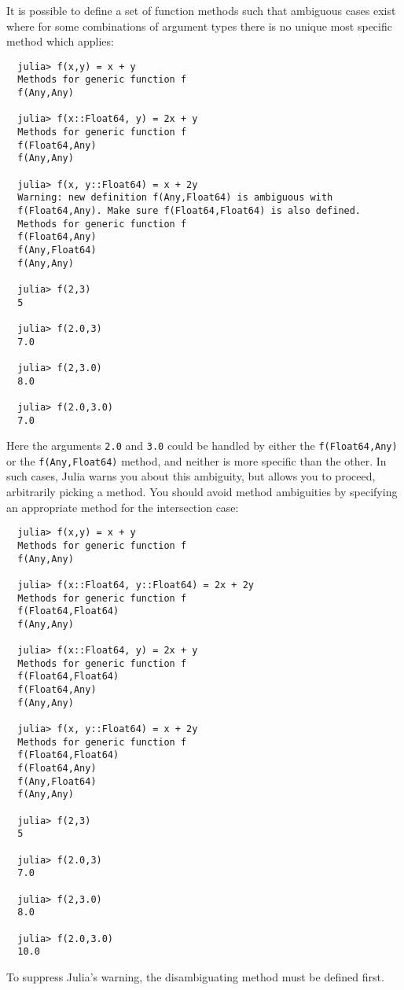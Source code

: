 \documentclass{article}
\begin{document}
It is possible to define a set of function methods such that ambiguous cases exist where for some combinations of argument types there is no unique most specific method which applies:
\begin{verbatim}
  julia> f(x,y) = x + y
  Methods for generic function f
  f(Any,Any)

  julia> f(x::Float64, y) = 2x + y
  Methods for generic function f
  f(Float64,Any)
  f(Any,Any)

  julia> f(x, y::Float64) = x + 2y
  Warning: new definition f(Any,Float64) is ambiguous with
  f(Float64,Any). Make sure f(Float64,Float64) is also defined.
  Methods for generic function f
  f(Float64,Any)
  f(Any,Float64)
  f(Any,Any)

  julia> f(2,3)
  5

  julia> f(2.0,3)
  7.0

  julia> f(2,3.0)
  8.0

  julia> f(2.0,3.0)
  7.0
\end{verbatim}
Here the arguments \verb|2.0| and \verb|3.0| could be handled by either the \verb|f(Float64,Any)| or the \verb|f(Any,Float64)| method, and neither is more specific than the other.
In such cases, Julia warns you about this ambiguity, but allows you to proceed, arbitrarily picking a method.
You should avoid method ambiguities by specifying an appropriate method for the intersection case:
\begin{verbatim}
  julia> f(x,y) = x + y
  Methods for generic function f
  f(Any,Any)

  julia> f(x::Float64, y::Float64) = 2x + 2y
  Methods for generic function f
  f(Float64,Float64)
  f(Any,Any)

  julia> f(x::Float64, y) = 2x + y
  Methods for generic function f
  f(Float64,Float64)
  f(Float64,Any)
  f(Any,Any)

  julia> f(x, y::Float64) = x + 2y
  Methods for generic function f
  f(Float64,Float64)
  f(Float64,Any)
  f(Any,Float64)
  f(Any,Any)

  julia> f(2,3)
  5

  julia> f(2.0,3)
  7.0

  julia> f(2,3.0)
  8.0

  julia> f(2.0,3.0)
  10.0
\end{verbatim}
To suppress Julia's warning, the disambiguating method must be defined first.
\end{document}
